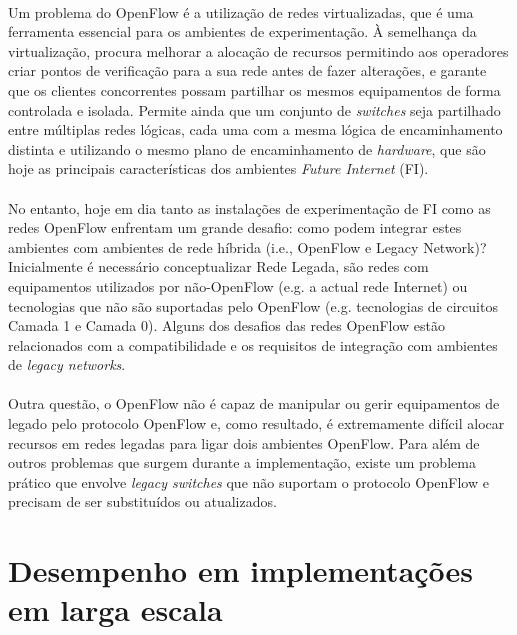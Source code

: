 \documentclass{llncs}
\begin{document}
\paragraph{}
Um problema do OpenFlow é a utilização de redes virtualizadas, que é uma ferramenta essencial para os ambientes de experimentação.
À semelhança da virtualização, procura melhorar a alocação de recursos permitindo aos operadores criar pontos de verificação para a sua rede antes de fazer alterações, e garante que os clientes concorrentes possam partilhar os mesmos equipamentos de forma controlada e isolada. 
Permite ainda que um conjunto de \textit{switches} seja partilhado entre múltiplas redes lógicas, cada uma com a mesma lógica de encaminhamento distinta e utilizando o mesmo plano de encaminhamento de \textit{hardware}, que são hoje as principais características dos ambientes \textit{Future Internet} (FI).
\paragraph{}
No entanto, hoje em dia tanto as instalações de experimentação de FI como as redes OpenFlow enfrentam um grande desafio: como podem integrar estes ambientes com ambientes de rede híbrida (i.e., OpenFlow e Legacy Network)? 
Inicialmente é necessário conceptualizar Rede Legada, são redes com equipamentos utilizados por não-OpenFlow (e.g. a actual rede Internet) ou tecnologias que não são suportadas pelo OpenFlow (e.g. tecnologias de circuitos Camada 1 e Camada 0). 
Alguns dos desafios das redes OpenFlow estão relacionados com a compatibilidade e os requisitos de integração com ambientes de \textit{legacy networks}.
\paragraph{}
Outra questão, o OpenFlow não é capaz de manipular ou gerir equipamentos de legado pelo protocolo OpenFlow e, como resultado, é extremamente difícil alocar recursos em redes legadas para ligar dois ambientes OpenFlow. 
Para além de outros problemas que surgem durante a implementação, existe um problema prático que envolve \textit{ legacy switches} que não suportam o protocolo OpenFlow e precisam de ser substituídos ou atualizados.

\section{Desempenho em implementações em larga escala}
\end{document}
